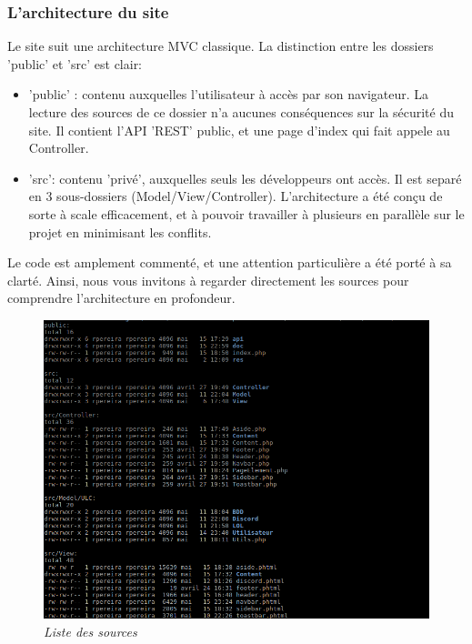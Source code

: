 \documentclass[10pt]{article}
\begin{document}
      \newpage
      \subsubsection{L'architecture du site}
	Le site suit une architecture MVC classique.
	La distinction entre les dossiers 'public' et 'src' est clair:
	\begin{itemize}[label=-]
	  \item 'public' : contenu auxquelles l'utilisateur à accès par son navigateur. La lecture des sources de ce dossier n'a aucunes conséquences sur la sécurité du site.
	  Il contient l'API 'REST' public, et une page d'index qui fait appele au Controller.
	  \item 'src': contenu 'privé', auxquelles seuls les développeurs ont accès. Il est separé en 3 sous-dossiers (Model/View/Controller).
	  L'architecture a été conçu de sorte à scale efficacement, et à pouvoir travailler à plusieurs en parallèle sur le projet en minimisant les conflits.
	\end{itemize}
	Le code est amplement commenté, et une attention particulière a été porté à sa clarté.
	Ainsi, nous vous invitons à regarder directement les sources pour comprendre l'architecture en profondeur.
	
      \begin{figure}[H]
	\begin{center}
	  \includegraphics[width=16cm,keepaspectratio]{./images/architecture.png}
	\end{center}
	\caption{\textit{Liste des sources}}
	\label{architecture}
      \end{figure}
      
\end{document}
